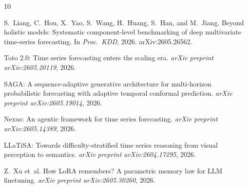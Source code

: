 \documentclass[11pt,a4paper]{article}
\begin{document}

\begin{thebibliography}{10}

S.~Liang, C.~Hou, X.~Yao, S.~Wang, H.~Huang, S.~Han, and M.~Jiang.
\newblock Beyond holistic models: Systematic component-level benchmarking of deep multivariate time-series forecasting.
\newblock In \emph{Proc.\ KDD}, 2026.
\newblock arXiv:2605.26562.

Toto 2.0: Time series forecasting enters the scaling era.
\newblock \emph{arXiv preprint arXiv:2605.20119}, 2026.

SAGA: A sequence-adaptive generative architecture for multi-horizon probabilistic forecasting with adaptive temporal conformal prediction.
\newblock \emph{arXiv preprint arXiv:2605.19014}, 2026.

Nexus: An agentic framework for time series forecasting.
\newblock \emph{arXiv preprint arXiv:2605.14389}, 2026.

LLaTiSA: Towards difficulty-stratified time series reasoning from visual perception to semantics.
\newblock \emph{arXiv preprint arXiv:2604.17295}, 2026.

Z.~Xu et~al.
\newblock How {LoRA} remembers? {A} parametric memory law for {LLM} finetuning.
\newblock \emph{arXiv preprint arXiv:2605.30260}, 2026.

\end{thebibliography}
\end{document}
